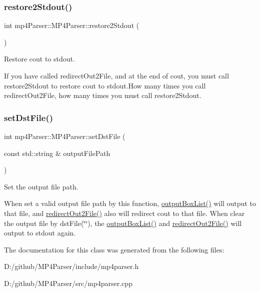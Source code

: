 \subsubsection{\texorpdfstring{restore2Stdout()}{restore2Stdout()}}
{\footnotesize\ttfamily int mp4\+Parser\+::\+M\+P4\+Parser\+::restore2\+Stdout (\begin{DoxyParamCaption}{ }\end{DoxyParamCaption})}



Restore cout to stdout. 

If you have called redirect\+Out2\+File, and at the end of cout, you must call restore2\+Stdout to restore cout to stdout.\+How many times you call redirect\+Out2\+File, how many times you must call restore2\+Stdout. \mbox{\label{classmp4_parser_1_1_m_p4_parser_ac5ac99898f7161ebcf828c6f8be2f32a}} 
\subsubsection{\texorpdfstring{setDstFile()}{setDstFile()}}
{\footnotesize\ttfamily int mp4\+Parser\+::\+M\+P4\+Parser\+::set\+Dst\+File (\begin{DoxyParamCaption}\item[{const std\+::string \&}]{output\+File\+Path }\end{DoxyParamCaption})}



Set the output file path. 

When set a valid output file path by this function, \mbox{\hyperlink{classmp4_parser_1_1_m_p4_parser_aded5fb465d00d6a7cdde6fa276615c49}{output\+Box\+List()}} will output to that file, and \mbox{\hyperlink{classmp4_parser_1_1_m_p4_parser_a29f0fc9e2e0c7ed4751e44b8f28092c3}{redirect\+Out2\+File()}} also will redirect cout to that file. When clear the output file by dst\+File(\char`\"{}\char`\"{}), the \mbox{\hyperlink{classmp4_parser_1_1_m_p4_parser_aded5fb465d00d6a7cdde6fa276615c49}{output\+Box\+List()}} and \mbox{\hyperlink{classmp4_parser_1_1_m_p4_parser_a29f0fc9e2e0c7ed4751e44b8f28092c3}{redirect\+Out2\+File()}} will output to stdout again. 

The documentation for this class was generated from the following files\+:\begin{DoxyCompactItemize}
\item 
D\+:/github/\+M\+P4\+Parser/include/mp4parser.\+h\item 
D\+:/github/\+M\+P4\+Parser/src/mp4parser.\+cpp\end{DoxyCompactItemize}
